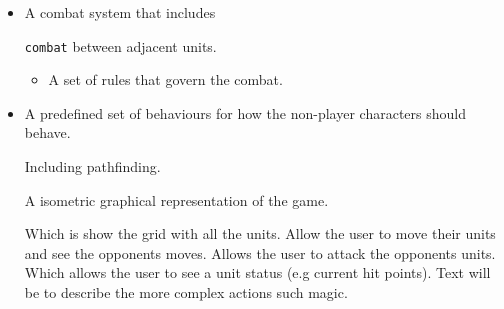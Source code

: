 \begin{itemize}
\begin{itemize}
	\item A combat system that includes
		\begin{itemize}
			\tick \texttt{combat} between adjacent units.
			\begin{itemize}
				\tick When the unit hit-points are reduced to zero they are \texttt{defeated} and are removed from the map
			\item A set of rules that govern the combat.
			\end{itemize}
			
		\end{itemize}
	
	\item A predefined set of behaviours for how the non-player characters should behave.
	\begin{itemize}
		\tick Including pathfinding.
	\end{itemize}
	
	\tick A isometric graphical representation of the game.
	\begin{itemize}
		\tick Which is show the grid with all the units.
		\tick Allow the user to move their units and see the opponents moves.
		\tick Allows the user to attack the opponents units.
		\tick Which allows the user to see a unit status (e.g current hit points).
		\tick Text will be to describe the more complex actions such magic.
	\end{itemize}
\end{itemize}
\end{itemize}

